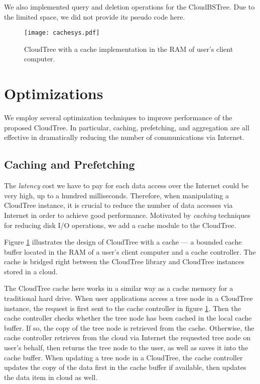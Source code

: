 \documentclass[10pt, conference, compsocconf]{IEEEtran}
\begin{document}
We also implemented query and deletion operations for the CloudBSTree.
Due to the limited space, we did not provide its pseudo code here.


\begin{figure}[t]
\begin{center}
\texttt{[image: cachesys.pdf]}
\caption{CloudTree with a cache implementation in the RAM of user's client computer.}
\label{fig:cache}
\end{center}
\end{figure}


\section{Optimizations}
\label{optimize}
We employ several optimization techniques to improve performance of the proposed CloudTree.
In particular, caching, prefetching, and aggregation are all effective in dramatically 
reducing the number of communications via Internet.

\subsection{Caching and Prefetching}
\label{cache}
The \emph{latency} cost we have to pay for each data access over the Internet could be very high, up to a hundred milliseconds. 
Therefore, when manipulating a CloudTree instance, it is crucial to reduce the number of data accesses via Internet
in order to achieve good performance.
Motivated by \emph{caching} techniques for reducing disk I/O operations, 
we add a cache module to the CloudTree.

Figure \ref{fig:cache} illustrates the design of CloudTree with a cache --- a bounded cache buffer located in the RAM of a user's client computer and
a cache controller.
The cache is bridged right between the CloudTree library and CloudTree instances stored in a cloud. 


The CloudTree cache here works in a similar way as a cache memory for a traditional hard drive.
When user applications access a tree node in a CloudTree instance, 
the request is first sent to the cache controller in figure \ref{fig:cache}.  
Then the cache controller checks whether the tree node has been cached in the local cache buffer.
If so, the copy of the tree node is retrieved from the cache. Otherwise, 
the cache controller retrieves from the cloud via Internet the requested tree node on user's behalf, 
then returns the tree node to the user, as well as saves it into the cache buffer.
When updating a tree node in a CloudTree, the cache controller updates the copy of the data first 
in the cache buffer if available, then updates the data item in cloud as well.
\end{document}
